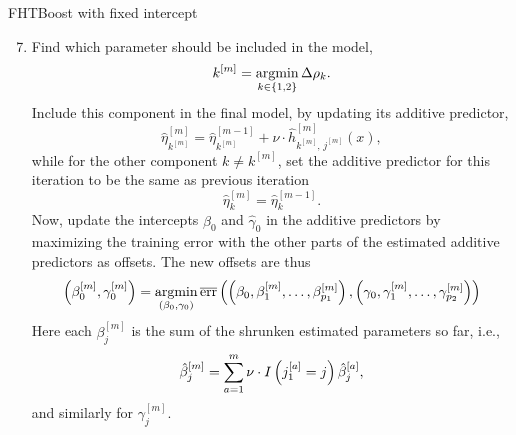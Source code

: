 \begin{algorithm}
\caption{FHTBoost with fixed intercept}
\label{algo:fhtboost-with-intercept}
\begin{enumerate}
    \setcounter{enumi}{6}
    \item
        Find which parameter should be included in the model,
        \begin{equation*}
            k^{[m]}=\operatorname*{argmin}_{k\in\{1,2\}}\Delta\rho_k.
        \end{equation*}
        Include this component in the final model, by updating its additive predictor,
        \begin{equation*}
            \hat{\eta}^{[m]}_{k^{[m]}}=\hat{\eta}^{[m-1]}_{k^{[m]}}+\nu\cdot\hat{h}^{[m]}_{k^{[m]},\,j^{[m]}}(x),
        \end{equation*}
        while for the other component $k\neq k^{[m]}$, set the additive predictor for this iteration to be the same as previous iteration
        \begin{equation*}
            \hat{\eta}^{[m]}_{k}=\hat{\eta}^{[m-1]}_{k}.
        \end{equation*}
        Now, update the intercepts $\hat{\beta}_0$ and $\hat{\gamma}_0$ in the additive predictors by maximizing the training error with the other parts of the estimated additive predictors as offsets.
        The new offsets are thus
        \begin{equation*}
            \left(\beta_0^{[m]},\gamma_0^{[m]}\right)=\operatorname*{argmin}_{\left(\beta_0,\gamma_0\right)}
            \overline{\text{err}}
                \left(
                    \left(
                        \beta_0,\beta^{[m]}_1,\ldots,\beta^{[m]}_{p_1}
                    \right),
                    \left(
                        \gamma_0,\gamma^{[m]}_1,\ldots,\gamma^{[m]}_{p_2}
                    \right)
                \right)
        \end{equation*}
        Here each $\beta_j^{[m]}$ is the sum of the shrunken estimated parameters so far, i.e.,
        \begin{equation*}
            \hat{\beta}_j^{[m]}=\sum_{a=1}^{m}\nu\cdot I\left(j_1^{[a]}=j\right)\hat{\beta}_j^{[a]},
        \end{equation*}
        and similarly for $\gamma_j^{[m]}$.
\end{enumerate}
\end{algorithm}